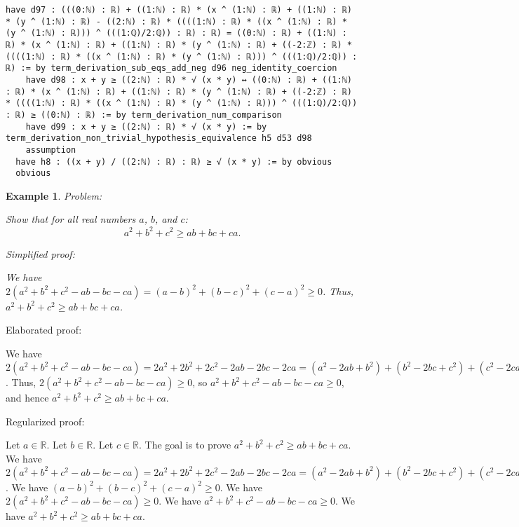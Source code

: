 \documentclass{article}
\newtheorem{example}{Example}
\begin{document}
\begin{tcolorbox}[colback=white!10, width=\linewidth]
\begin{lstlisting}[language=Lean4]
    have d97 : (((0:ℕ) : ℝ) + ((1:ℕ) : ℝ) * (x ^ (1:ℕ) : ℝ) + ((1:ℕ) : ℝ) * (y ^ (1:ℕ) : ℝ) - ((2:ℕ) : ℝ) * ((((1:ℕ) : ℝ) * ((x ^ (1:ℕ) : ℝ) * (y ^ (1:ℕ) : ℝ))) ^ (((1:ℚ)/2:ℚ)) : ℝ) : ℝ) = ((0:ℕ) : ℝ) + ((1:ℕ) : ℝ) * (x ^ (1:ℕ) : ℝ) + ((1:ℕ) : ℝ) * (y ^ (1:ℕ) : ℝ) + ((-2:ℤ) : ℝ) * ((((1:ℕ) : ℝ) * ((x ^ (1:ℕ) : ℝ) * (y ^ (1:ℕ) : ℝ))) ^ (((1:ℚ)/2:ℚ)) : ℝ) := by term_derivation_sub_eqs_add_neg d96 neg_identity_coercion
    have d98 : x + y ≥ ((2:ℕ) : ℝ) * √ (x * y) ↔ ((0:ℕ) : ℝ) + ((1:ℕ) : ℝ) * (x ^ (1:ℕ) : ℝ) + ((1:ℕ) : ℝ) * (y ^ (1:ℕ) : ℝ) + ((-2:ℤ) : ℝ) * ((((1:ℕ) : ℝ) * ((x ^ (1:ℕ) : ℝ) * (y ^ (1:ℕ) : ℝ))) ^ (((1:ℚ)/2:ℚ)) : ℝ) ≥ ((0:ℕ) : ℝ) := by term_derivation_num_comparison
    have d99 : x + y ≥ ((2:ℕ) : ℝ) * √ (x * y) := by term_derivation_non_trivial_hypothesis_equivalence h5 d53 d98
    assumption
  have h8 : ((x + y) / ((2:ℕ) : ℝ) : ℝ) ≥ √ (x * y) := by obvious
  obvious

\end{lstlisting}
\end{tcolorbox}


\begin{example}
Problem:
\begin{tcolorbox}[colback=yellow!10, width=\linewidth]
Show that for all real numbers $a$, $b$, and $c$:
    $$a^2 + b^2 + c^2 \geq ab + bc + ca.$$
\end{tcolorbox}

Simplified proof:
\begin{tcolorbox}[colback=blue!10, width=\linewidth]
We have $2(a^2 + b^2 + c^2 - ab - bc - ca) = (a-b)^2 + (b-c)^2 + (c-a)^2 \ge 0$. Thus, $a^2 + b^2 + c^2 \geq ab + bc + ca$.
\end{tcolorbox}
\end{example}

Elaborated proof:
\begin{tcolorbox}[colback=green!10, width=\linewidth]
We have $2(a^2 + b^2 + c^2 - ab - bc - ca) = 2a^2 + 2b^2 + 2c^2 - 2ab - 2bc - 2ca = (a^2 - 2ab + b^2) + (b^2 - 2bc + c^2) + (c^2 - 2ca + a^2) = (a-b)^2 + (b-c)^2 + (c-a)^2 \ge 0$. Thus, $2(a^2 + b^2 + c^2 - ab - bc - ca) \ge 0$, so $a^2 + b^2 + c^2 - ab - bc - ca \ge 0$, and hence $a^2 + b^2 + c^2 \geq ab + bc + ca$.
\end{tcolorbox}

Regularized proof:
\begin{tcolorbox}[colback=red!10, width=\linewidth]
Let $a\in\mathbb{R}$.
Let $b\in\mathbb{R}$.
Let $c\in\mathbb{R}$.
The goal is to prove $a^2 + b^2 + c^2 \geq ab + bc + ca$.
We have $2(a^2 + b^2 + c^2 - ab - bc - ca) = 2a^2 + 2b^2 + 2c^2 - 2ab - 2bc - 2ca = (a^2 - 2ab + b^2) + (b^2 - 2bc + c^2) + (c^2 - 2ca + a^2) = {(a-b)}^2 + {(b-c)}^2 + {(c-a)}^2$.
We have ${(a-b)}^2 + {(b-c)}^2 + {(c-a)}^2 \ge 0$.
We have $2(a^2 + b^2 + c^2 - ab - bc - ca) \ge 0$.
We have $a^2 + b^2 + c^2 - ab - bc - ca \ge 0$.
We have $a^2 + b^2 + c^2 \geq ab + bc + ca$.
\end{tcolorbox}
\end{document}
